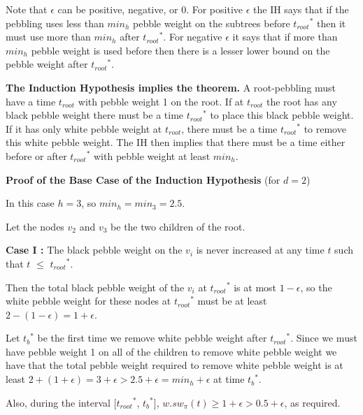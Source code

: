 \documentclass[oribib1]{llncs}
\newcommand{\troot}{t_{root}}
\newcommand{\troots}{{t_{root}}^*}
\newcommand{\tbs}{{t_b}^{*}}
\begin{document}
\medskip

Note that $\epsilon$ can be positive, negative, or 0.  For positive
$\epsilon$ the IH says that if the pebbling uses less than $min_h$
pebble weight on the subtrees before $\troots$ then it must use
more than $min_h$ after $\troots$.  For negative $\epsilon$ it says
that if more than $min_h$ pebble weight is used before then there is
a lesser lower bound on the pebble weight after $\troots$.

\medskip
\noindent
{\bf The Induction Hypothesis implies the theorem.}
A root-pebbling 
must have a time $\troot$ with pebble weight 1 on the root.
If at $\troot$ the root has any black pebble weight there must be a
time $\troots$ to place this black pebble weight. If it has only white
pebble weight at $\troot$, there must be a time $\troots$ to remove
this white pebble weight.  
The IH then implies that there must be a time either before or after $\troots$
with pebble weight at least $min_h$.

\medskip


\medskip
\noindent
{\bf Proof of the Base Case of the Induction Hypothesis} (for $d=2$)

In this case $h=3$, so $min_h = min_3 =2.5$.

Let the nodes $v_2$ and $v_3$ be the two children of the root.

\medskip

\noindent
{\bf Case I :} The black pebble weight on the $v_i$ is never increased at any time $t$ such that $t$ $\leq$
$\troots$.

Then the total black pebble weight of the $v_i$ at
$\troots$ is at most $1-\epsilon$, so the white pebble weight for these nodes at
$\troots$ must be at least $2-(1-\epsilon) = 1+ \epsilon$.

Let $\tbs$ be the first time we remove white pebble weight after $\troots$. Since we must have pebble weight 1 on all of the children to remove white pebble weight we have that the total pebble weight required to remove white
pebble weight is at least
$2+(1 + \epsilon) = 3 + \epsilon > 2.5 + \epsilon = min_h + \epsilon$ at time $\tbs$.


Also, during the interval [$\troots$, $\tbs$],
$w.sw_\pi(t) \geq 1 + \epsilon > 0.5 + \epsilon$, as required.
\end{document}
